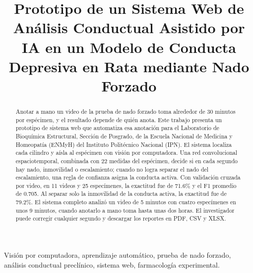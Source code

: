 \documentclass[conference,letterpaper]{IEEEtran}
\begin{document}
\title{Prototipo de un Sistema Web de Análisis Conductual Asistido por IA en un Modelo de
Conducta Depresiva en Rata mediante Nado Forzado}

\author{
}

\maketitle

\renewcommand{\IEEEkeywordsname}{Palabras clave}

\begin{abstract}
Anotar a mano un video de la prueba de nado forzado toma alrededor de 30 minutos por
espécimen, y el resultado depende de quién anota. Este trabajo presenta un prototipo de
sistema web que automatiza esa anotación para el Laboratorio de Bioquímica Estructural,
Sección de Posgrado, de la Escuela Nacional de Medicina y Homeopatía (ENMyH) del Instituto
Politécnico Nacional (IPN). El sistema localiza cada cilindro y aísla al espécimen con
visión por computadora. Una red convolucional espaciotemporal, combinada con 22 medidas del
espécimen, decide si en cada segundo hay nado, inmovilidad o escalamiento; cuando no logra
separar el nado del escalamiento, una regla de confianza asigna la conducta activa. Con
validación cruzada por video, en 11 videos y 25 especímenes, la exactitud fue de 71.6\% y
el F1 promedio de 0.705. Al separar solo la inmovilidad de la conducta activa, la exactitud
fue de 79.2\%. El sistema completo analizó un video de 5 minutos con cuatro especímenes en
unos 9 minutos, cuando anotarlo a mano toma hasta unas dos horas. El investigador puede
corregir cualquier segundo y descargar los reportes en PDF, CSV y XLSX.
\end{abstract}

\begin{IEEEkeywords}
Visión por computadora, aprendizaje automático, prueba de nado forzado, análisis
conductual preclínico, sistema web, farmacología experimental.
\end{IEEEkeywords}
\end{document}
